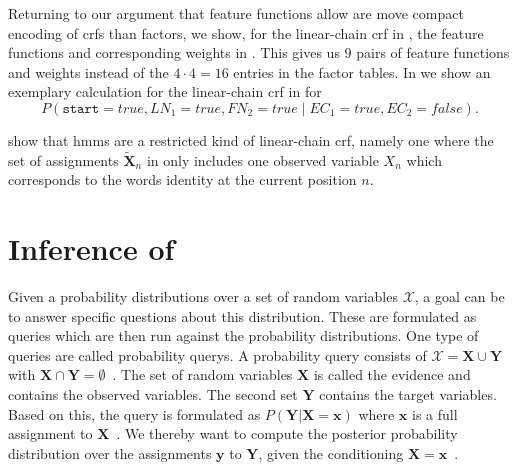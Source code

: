 Returning to our argument that \glspl{feature function} allow are move compact encoding of \glspl{crf} than \glspl{factor}, we show, for the \gls{linear-chain crf} in , the \glspl{feature function} and corresponding weights in .
This gives us $9$ pairs of \glspl{feature function} and weights instead of the $4\cdot 4=16$ entries in the \gls{factor} tables.
In  we show an exemplary calculation for the \gls{linear-chain crf} in  for
\begin{equation*}
P(\texttt{start}{=}true,LN_1{=}true,FN_2{=}true\mid EC_1{=}true,EC_2{=}false).
\end{equation*}
\bigskip

\citet{sutton2010introduction} show that \glspl{hmm} are a restricted kind of \gls{linear-chain crf}, namely one where the set of assignments $\mathbf{\tilde{X}}_n$ in  only includes one \gls{observed variable} $X_n$ which corresponds to the words identity at the current position $n$.

\section{Inference of }\label{sec:inference-crfs}

Given a \glspl{probability distribution} over a set of \glspl{random variable} $\mathcal{X}$, a goal can be to answer specific questions about this distribution.
These are formulated as queries which are then run against the \glspl{probability distribution}.
One type of queries are called \glspl{probability query}.
A \gls{probability query} consists of $\mathcal{X}=\mathbf{X}\cup\mathbf{Y}$ with $\mathbf{X}\cap\mathbf{Y}=\emptyset$~\citep{koller2009probabilistic}.
The set of \glspl{random variable} $\mathbf{X}$ is called the \gls{evidence} and contains the \glspl{observed variable}.
The second set $\mathbf{Y}$ contains the \glspl{target variable}.
Based on this, the query is formulated as $P(\mathbf{Y}|\mathbf{X}=\mathbf{x})$ where $\mathbf{x}$ is a \gls{full assignment} to $\mathbf{X}$~\citep{koller2009probabilistic}.
We thereby want to compute the posterior \gls{probability distribution} over the assignments $\mathbf{y}$ to $\mathbf{Y}$, given the conditioning $\mathbf{X}=\mathbf{x}$~\citep{koller2009probabilistic}.


